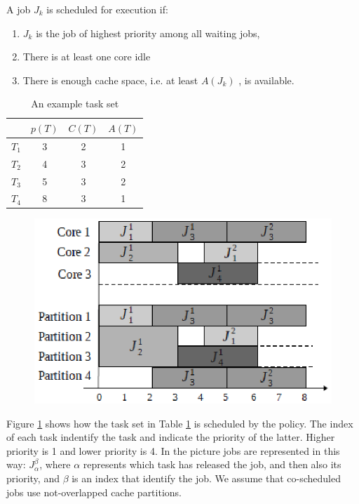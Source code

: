 A job $J_k$ is scheduled for execution if:

\begin{enumerate}
	\item $J_k$ is the job of highest priority among all waiting jobs,
	\item There is at least one core idle
	\item There is enough cache space, i.e. at least $A(J_k)$ , is available.
\end{enumerate}

\begin{table}[htbp]
\begin{center}
\begin{tabular}{l|c|c|c}
	\hline
	& $p(T)$ & $C(T)$ & $A(T)$ \\ \hline
	$T_1$ & 3 & 2 & 1 \\ \hline
	$T_2$ & 4 & 3 & 2 \\ \hline
	$T_3$ & 5 & 3 & 2 \\ \hline
	$T_4$ & 8 & 3 & 1 \\ 
	\hline
\end{tabular}
\caption{An example task set}
\label{tab:cache_task_set}
\end{center}
\end{table}

\begin{figure}[htbp]
\centering
\includegraphics[width=\widefigure]{images/schedule.eps}
\caption{}
\label{fig:sched_example}
\end{figure}

Figure \ref{fig:sched_example} shows how the task set in Table \ref{tab:cache_task_set} is scheduled by the policy. The index of each task 
indentify the task and indicate the priority of the latter. Higher priority is 1 and lower priority is 4. In the picture jobs are represented in this way: 
$J_{\alpha}^\beta$, where $\alpha$ represents which task has released the job, and then also its priority, and $\beta$ is an index that identify the job.
We assume that co-scheduled jobs use not-overlapped cache partitions.

